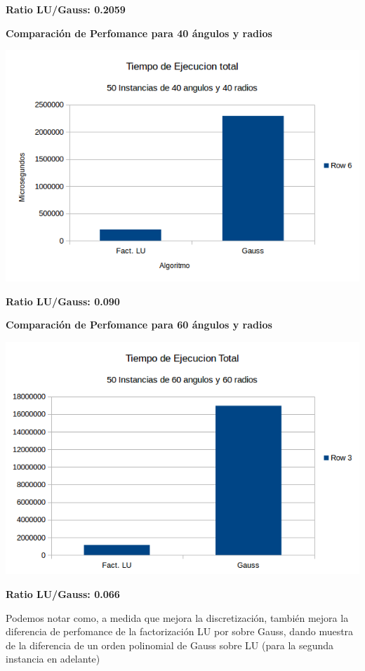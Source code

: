  \textbf{Ratio LU/Gauss: 0.2059}

  	\textbf{Comparaci\'on de Perfomance para 40 \'angulos y radios }\\
\begin{center}
\includegraphics[scale=0.7]{experimentos2a_2b/2b4040.png}
\end{center}

 \textbf{Ratio LU/Gauss: 0.090}

  	\textbf{Comparaci\'on de Perfomance para 60 \'angulos y radios }\\
\begin{center}
\includegraphics[scale=0.7]{experimentos2a_2b/2b6060.png}
\end{center}

 \textbf{Ratio LU/Gauss: 0.066}

Podemos notar como, a medida que mejora la discretizaci\'on, tambi\'en mejora la diferencia de perfomance de la factorizaci\'on LU por sobre Gauss, dando muestra de la diferencia de un orden polinomial de Gauss sobre LU (para la segunda instancia en adelante)

